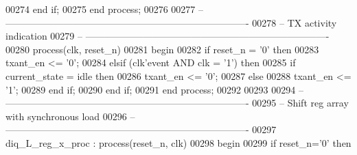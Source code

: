 \begin{DoxyCode}
00274    \textcolor{keywordflow}{end} \textcolor{keywordflow}{if};
00275  \textcolor{keywordflow}{end} \textcolor{keywordflow}{process};
00276  
00277 \textcolor{keyword}{-- ----------------------------------------------------------------------------}
00278 \textcolor{keyword}{-- TX activity indication}
00279 \textcolor{keyword}{-- ----------------------------------------------------------------------------}
00280 \textcolor{keywordflow}{process}(clk, reset_n)
00281 \textcolor{vhdlkeyword}{ begin}
00282    \textcolor{keywordflow}{if} \textcolor{vhdlchar}{reset_n} \textcolor{vhdlchar}{=} \textcolor{vhdlchar}{'}\textcolor{vhdllogic}{}\textcolor{vhdllogic}{0}\textcolor{vhdlchar}{'} \textcolor{keywordflow}{then}
00283       \textcolor{vhdlchar}{txant_en}  \textcolor{vhdlchar}{<=} \textcolor{vhdlchar}{'}\textcolor{vhdllogic}{}\textcolor{vhdllogic}{0}\textcolor{vhdlchar}{'};
00284    \textcolor{keywordflow}{elsif} \textcolor{vhdlchar}{(}\textcolor{vhdlchar}{clk}\textcolor{vhdlchar}{'}\textcolor{vhdlkeyword}{event} \textcolor{keywordflow}{AND} \textcolor{vhdlchar}{clk} \textcolor{vhdlchar}{=} \textcolor{vhdlchar}{'}\textcolor{vhdllogic}{}\textcolor{vhdllogic}{1}\textcolor{vhdlchar}{'}\textcolor{vhdlchar}{)} \textcolor{keywordflow}{then}
00285       \textcolor{keywordflow}{if} \textcolor{vhdlchar}{current_state} \textcolor{vhdlchar}{=} \textcolor{vhdlchar}{idle} \textcolor{keywordflow}{then} 
00286          \textcolor{vhdlchar}{txant_en} \textcolor{vhdlchar}{<=} \textcolor{vhdlchar}{'}\textcolor{vhdllogic}{}\textcolor{vhdllogic}{0}\textcolor{vhdlchar}{'};
00287       \textcolor{keywordflow}{else} 
00288          \textcolor{vhdlchar}{txant_en} \textcolor{vhdlchar}{<=} \textcolor{vhdlchar}{'}\textcolor{vhdllogic}{}\textcolor{vhdllogic}{1}\textcolor{vhdlchar}{'};
00289       \textcolor{keywordflow}{end} \textcolor{keywordflow}{if};
00290    \textcolor{keywordflow}{end} \textcolor{keywordflow}{if};
00291  \textcolor{keywordflow}{end} \textcolor{keywordflow}{process};
00292  
00293  
00294 \textcolor{keyword}{-- ----------------------------------------------------------------------------}
00295 \textcolor{keyword}{-- Shift reg array with synchronous load }
00296 \textcolor{keyword}{-- ----------------------------------------------------------------------------}
00297 diq\_L\_reg\_x\_proc : \textcolor{keywordflow}{process}(reset_n, clk)
00298 \textcolor{vhdlkeyword}{   begin}
00299       \textcolor{keywordflow}{if} \textcolor{vhdlchar}{reset_n}\textcolor{vhdlchar}{=}\textcolor{vhdlchar}{'}\textcolor{vhdllogic}{}\textcolor{vhdllogic}{0}\textcolor{vhdlchar}{'} \textcolor{keywordflow}{then}

\end{DoxyCode}
